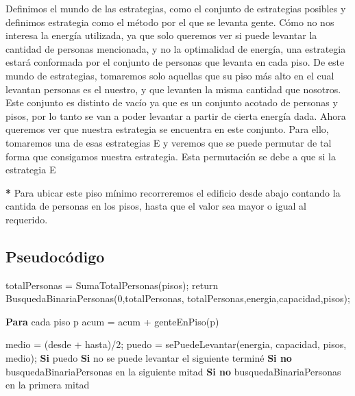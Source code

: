 Definimos el mundo de las estrategias, como el conjunto de estrategias posibles y definimos estrategia como el método por el que se levanta gente. Cómo no nos interesa
la energía utilizada, ya que solo queremos ver si puede levantar la cantidad de personas mencionada, y no la optimalidad de energía, una estrategia estará conformada por el
conjunto de personas que levanta en cada piso. De este mundo de estrategias, tomaremos solo aquellas que su piso más alto en el cual levantan personas es el nuestro, y que
levanten la misma cantidad que nosotros. Este conjunto es distinto de vacío ya que es un conjunto acotado de personas y pisos, por lo tanto se van a poder levantar a partir de
cierta energía dada. Ahora queremos ver que nuestra estrategia se encuentra en este conjunto. Para ello, tomaremos una de esas estrategias E y veremos que se puede permutar de tal
forma que consigamos nuestra estrategia. Esta permutación se debe a que si la estrategia E 


\small {\textbf{*} Para ubicar este piso mínimo recorreremos el edificio desde abajo contando la cantida de personas en los pisos, hasta que el valor sea mayor o igual al requerido.}




\subsection{Pseudoc\'odigo}
\begin{codebox}
\li		totalPersonas = SumaTotalPersonas(pisos);
\li		return BusquedaBinariaPersonas(0,totalPersonas, totalPersonas,energia,capacidad,pisos);
\end{codebox}

\begin{codebox}
\li		\textbf{Para} cada piso p \Do
\li			acum = acum + genteEnPiso(p) \End
\end{codebox}

\begin{codebox}
\li		medio = (desde + hasta)/2;
\li		puedo = sePuedeLevantar(energia, capacidad, pisos, medio);
\li 		\textbf{Si} puedo \Do
\li				\textbf{Si} no se puede levantar el siguiente terminé
\li 				\textbf{Si no} busquedaBinariaPersonas en la siguiente mitad \End
\li 		\textbf{Si no} busquedaBinariaPersonas en la primera mitad
\end{codebox}

